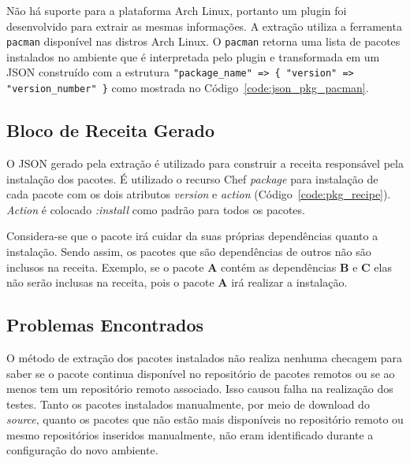 Não há suporte para a plataforma Arch Linux, portanto um plugin foi desenvolvido
para extrair as mesmas informações. A extração utiliza a ferramenta \texttt{pacman} disponível
nas distros Arch Linux. O \texttt{pacman} retorna uma lista de pacotes instalados no ambiente
que é interpretada pelo plugin e transformada em um JSON construído com a estrutura
\texttt{"package\_name" => \{ "version" => "version\_number" \}} como mostrada no
Código~\ref{code:json_pkg_pacman}.

\noindent\begin{minipage}{\textwidth}
  \lstset{style=shell}
  
\end{minipage}\hfill

\subsection{Bloco de Receita Gerado}

O JSON gerado pela extração é utilizado para construir a receita responsável pela instalação dos
pacotes. É utilizado o recurso Chef \textit{package} para instalação de cada pacote com os dois atributos
\textit{version} e \textit{action} (Código~\ref{code:pkg_recipe}). \textit{Action} é colocado \textit{\textit{:install}}
como padrão para todos os pacotes.

\noindent\begin{minipage}{\textwidth}
  \lstset{style=shell}
  
\end{minipage}\hfill

Considera-se que o pacote irá cuidar da suas próprias dependências quanto a instalação.
Sendo assim, os pacotes que são dependências de outros não são inclusos na receita. Exemplo, se o pacote
\textbf{A} contém as dependências \textbf{B} e \textbf{C} elas não serão inclusas na receita, pois o pacote \textbf{A} irá realizar a instalação.

\subsection{Problemas Encontrados}

O método de extração dos pacotes instalados não realiza nenhuma checagem para
saber se o pacote continua disponível no repositório de pacotes remotos ou
se ao menos tem um repositório remoto associado. Isso causou falha na realização
dos testes. Tanto os pacotes instalados manualmente, por meio de download do
\textit{source}, quanto os pacotes que não estão mais disponíveis no repositório remoto ou
mesmo repositórios inseridos manualmente, não eram identificado durante a
configuração do novo ambiente.

